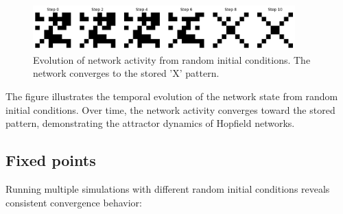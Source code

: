 \documentclass{article}
\begin{document}
\begin{figure}[H]
\centering
\includegraphics[width=0.9\textwidth]{Network Activity X.png}
\caption{Evolution of network activity from random initial conditions. The network converges to the stored 'X' pattern.}
\label{fig:network_dynamics}
\end{figure}

The figure illustrates the temporal evolution of the network state from random initial conditions. Over time, the network activity converges toward the stored pattern, demonstrating the attractor dynamics of Hopfield networks.




\subsection{Fixed points}


Running multiple simulations with different random initial conditions reveals consistent convergence behavior:
\end{document}
